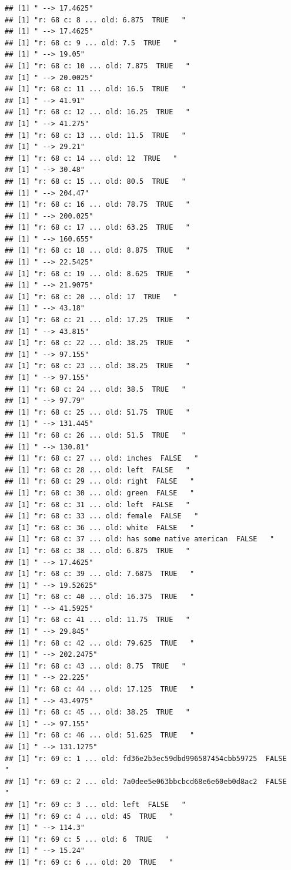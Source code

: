 \documentclass[]{article}
\begin{document}
\begin{verbatim}
## [1] " --> 17.4625"
## [1] "r: 68 c: 8 ... old: 6.875  TRUE   "
## [1] " --> 17.4625"
## [1] "r: 68 c: 9 ... old: 7.5  TRUE   "
## [1] " --> 19.05"
## [1] "r: 68 c: 10 ... old: 7.875  TRUE   "
## [1] " --> 20.0025"
## [1] "r: 68 c: 11 ... old: 16.5  TRUE   "
## [1] " --> 41.91"
## [1] "r: 68 c: 12 ... old: 16.25  TRUE   "
## [1] " --> 41.275"
## [1] "r: 68 c: 13 ... old: 11.5  TRUE   "
## [1] " --> 29.21"
## [1] "r: 68 c: 14 ... old: 12  TRUE   "
## [1] " --> 30.48"
## [1] "r: 68 c: 15 ... old: 80.5  TRUE   "
## [1] " --> 204.47"
## [1] "r: 68 c: 16 ... old: 78.75  TRUE   "
## [1] " --> 200.025"
## [1] "r: 68 c: 17 ... old: 63.25  TRUE   "
## [1] " --> 160.655"
## [1] "r: 68 c: 18 ... old: 8.875  TRUE   "
## [1] " --> 22.5425"
## [1] "r: 68 c: 19 ... old: 8.625  TRUE   "
## [1] " --> 21.9075"
## [1] "r: 68 c: 20 ... old: 17  TRUE   "
## [1] " --> 43.18"
## [1] "r: 68 c: 21 ... old: 17.25  TRUE   "
## [1] " --> 43.815"
## [1] "r: 68 c: 22 ... old: 38.25  TRUE   "
## [1] " --> 97.155"
## [1] "r: 68 c: 23 ... old: 38.25  TRUE   "
## [1] " --> 97.155"
## [1] "r: 68 c: 24 ... old: 38.5  TRUE   "
## [1] " --> 97.79"
## [1] "r: 68 c: 25 ... old: 51.75  TRUE   "
## [1] " --> 131.445"
## [1] "r: 68 c: 26 ... old: 51.5  TRUE   "
## [1] " --> 130.81"
## [1] "r: 68 c: 27 ... old: inches  FALSE   "
## [1] "r: 68 c: 28 ... old: left  FALSE   "
## [1] "r: 68 c: 29 ... old: right  FALSE   "
## [1] "r: 68 c: 30 ... old: green  FALSE   "
## [1] "r: 68 c: 31 ... old: left  FALSE   "
## [1] "r: 68 c: 33 ... old: female  FALSE   "
## [1] "r: 68 c: 36 ... old: white  FALSE   "
## [1] "r: 68 c: 37 ... old: has some native american  FALSE   "
## [1] "r: 68 c: 38 ... old: 6.875  TRUE   "
## [1] " --> 17.4625"
## [1] "r: 68 c: 39 ... old: 7.6875  TRUE   "
## [1] " --> 19.52625"
## [1] "r: 68 c: 40 ... old: 16.375  TRUE   "
## [1] " --> 41.5925"
## [1] "r: 68 c: 41 ... old: 11.75  TRUE   "
## [1] " --> 29.845"
## [1] "r: 68 c: 42 ... old: 79.625  TRUE   "
## [1] " --> 202.2475"
## [1] "r: 68 c: 43 ... old: 8.75  TRUE   "
## [1] " --> 22.225"
## [1] "r: 68 c: 44 ... old: 17.125  TRUE   "
## [1] " --> 43.4975"
## [1] "r: 68 c: 45 ... old: 38.25  TRUE   "
## [1] " --> 97.155"
## [1] "r: 68 c: 46 ... old: 51.625  TRUE   "
## [1] " --> 131.1275"
## [1] "r: 69 c: 1 ... old: fd36e2b3ec59dbd996587454cbb59725  FALSE   "
## [1] "r: 69 c: 2 ... old: 7a0dee5e063bbcbcd68e6e60eb0d8ac2  FALSE   "
## [1] "r: 69 c: 3 ... old: left  FALSE   "
## [1] "r: 69 c: 4 ... old: 45  TRUE   "
## [1] " --> 114.3"
## [1] "r: 69 c: 5 ... old: 6  TRUE   "
## [1] " --> 15.24"
## [1] "r: 69 c: 6 ... old: 20  TRUE   "

\end{verbatim}
\end{document}
